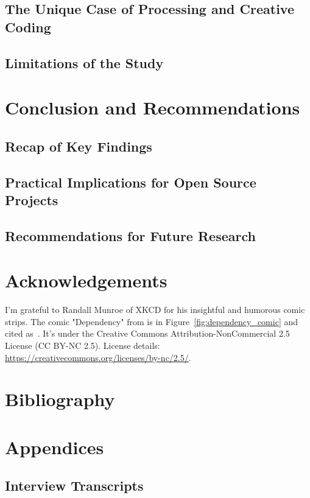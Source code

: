 \documentclass{article}
\begin{document}
\subsection{The Unique Case of Processing and Creative Coding}
\subsection{Limitations of the Study}

\section{Conclusion and Recommendations}

\subsection{Recap of Key Findings}
\subsection{Practical Implications for Open Source Projects}
\subsection{Recommendations for Future Research}

\section{Acknowledgements}
I'm grateful to Randall Munroe of XKCD for his insightful and humorous comic strips. The comic "Dependency" from  is in Figure~\ref{fig:dependency_comic} and cited as~\cite{munroeDependency2020}. It's under the Creative Commons Attribution-NonCommercial 2.5 License (CC BY-NC 2.5). License details: \url{https://creativecommons.org/licenses/by-nc/2.5/}.

\section{Bibliography}
\printbibliography

\section{Appendices}

\subsection{Interview Transcripts}
\end{document}
